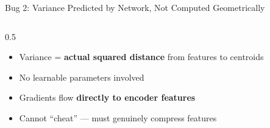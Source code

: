 \documentclass[aspectratio=169, 10pt]{beamer}
\begin{document}
\begin{frame}{Bug 2: Variance Predicted by Network, Not Computed Geometrically}
\begin{columns}[T]
\begin{column}{0.5\textwidth}
\vspace{0.15cm}
\begin{itemize}\small
    \item Variance = \textbf{actual squared distance} from features to centroids
    \item No learnable parameters involved
    \item Gradients flow \textbf{directly to encoder features}
    \item Cannot ``cheat'' --- must genuinely compress features
\end{itemize}
\end{column}
\end{columns}

\end{frame}

\end{document}
